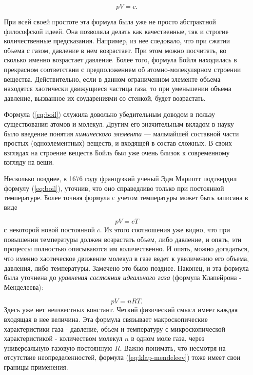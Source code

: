 \begin{equation}\label{eq:boil}
pV = c.
\end{equation}

При всей своей простоте эта формула была уже не просто абстрактной философской идеей.
Она позволяла делать как качественные, так и строгие количественные предсказания.
Например, из нее следовало, что при сжатии объема с газом, давление в нем возрастает.
При этом можно посчитать, во сколько именно возрастает давление.
Более того, формула Бойля находилась в прекрасном соответствии с предположением об атомно-молекулярном строении вещества.
Действительно, если в данном ограниченном элементе объема находятся хаотически движущиеся частица газа, то при уменьшении объема давление, вызванное их соударениями со стенкой, будет возрастать.

Формула (\ref{eq:boil}) служила довольно убедительным доводом в пользу существования атомов и молекул.
Другим его значительным вкладом в науку было введение понятия \textit{химического элемента} — мальчайшей составной части простых (одноэлементных) веществ, и входящей в состав сложных.
В своих взглядах на строение веществ Бойль был уже очень близок к современному взгляду на вещи. 

Несколько позднее, в 1676 году французкий ученый Эдм Мариотт подтвердил формулу (\ref{eq:boil}), уточнив, что оно справедливо только при постоянной температуре.
Более точная формула с учетом температуры может быть записана в виде

\begin{equation}\label{eq:boil-mariott}
pV = cT
\end{equation}
с некоторой новой постоянной $c$. 
Из этого соотношения уже видно, что при повышении температуры должен возрастать объем, либо давление, и опять, эти процессы полностью описываются им количественно.
И опять, можно догадаться, что именно хаотическое движение молекул в газе ведет к увеличению его объема, давления, либо температуры.
Замечено это было позднее.
Наконец, и эта формула была уточнена до \textit{уравнения состояния идеального газа} (формула Клапейрона - Менделеева):

\begin{equation}\label{eq:klap-mendeleev}
pV = nRT.
\end{equation}
Здесь уже нет неизвестных констант.
Четкий физический смысл имеет каждая входящая в нее величина.
Эта формула связывает макроскопические характеристики газа - давление, объем и температуру с микроскопической характеристикой - количеством молекул $n$ в одном моле газа, через универсальную газовую постоянную $R$.
Важно понимать, что несмотря на отсутствие неопределенностей, формула (\ref{eq:klap-mendeleev}) тоже имеет свои границы применения.

